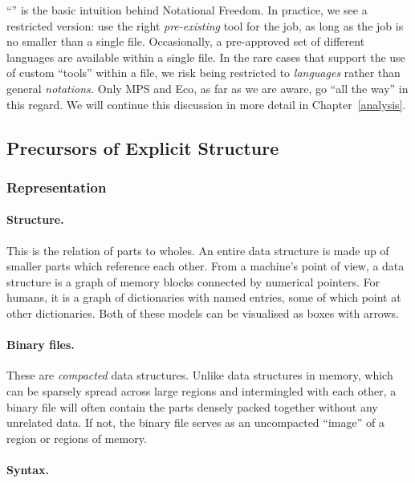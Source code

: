 ``\URTFJ'' is the basic intuition behind Notational Freedom. In
practice, we see a restricted version: use the right \emph{pre-existing}
tool for the job, as long as the job is no smaller than a single file.
Occasionally, a pre-approved set of different languages are available
within a single file. In the rare cases that support the use of custom
``tools'' within a file, we risk being restricted to \emph{languages}
rather than general \emph{notations.} Only MPS and Eco, as far as we are
aware, go ``all the way'' in this regard. We will continue this
discussion in more detail in Chapter~\ref{analysis}.

\hypertarget{precursors-of-explicit-structure}{%
\subsection{Precursors of Explicit
Structure}\label{precursors-of-explicit-structure}}

\hypertarget{representation}{%
\subsubsection{Representation}\label{representation}}

\paragraph{Structure.}

This is the relation of parts to wholes. An entire data structure is
made up of smaller parts which reference each other. From a machine's
point of view, a data structure is a graph of memory blocks connected by
numerical pointers. For humans, it is a graph of dictionaries with named
entries, some of which point at other dictionaries. Both of these models
can be visualised as boxes with arrows.

\paragraph{Binary files.}

These are \emph{compacted} data structures. Unlike data structures in
memory, which can be sparsely spread across large regions and
intermingled with each other, a binary file will often contain the parts
densely packed together without any unrelated data. If not, the binary
file serves as an uncompacted ``image'' of a region or regions of
memory.

\paragraph{Syntax.}

